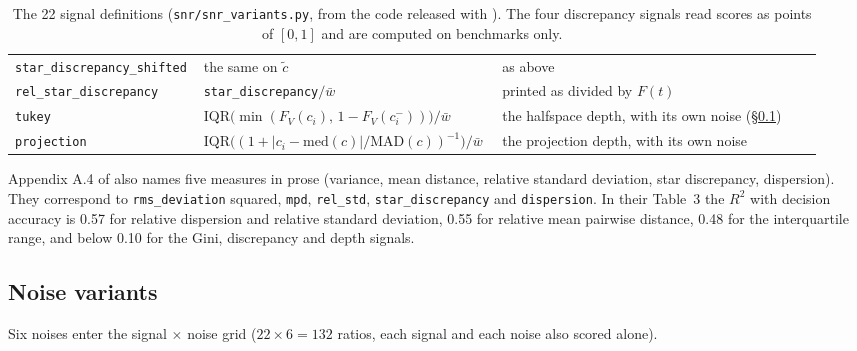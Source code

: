 \begin{table}[h]
\begin{tabular}{@{}p{0.19\linewidth}p{0.36\linewidth}p{0.39\linewidth}@{}}
\texttt{star\_discrepancy\_shifted} & the same on $\tilde{c}$ & as above \\
\texttt{rel\_star\_discrepancy} & \texttt{star\_discrepancy}$/\bar{w}$ & printed as divided by $F(t)$ \\
\texttt{tukey} & $\mathrm{IQR}\big(\min(F_V(c_i),\, 1 - F_V(c_i^-))\big)/\bar{w}$ & the halfspace depth, with its own noise (\S\ref{app:sur-noise}) \\
\texttt{projection} & $\mathrm{IQR}\big((1 + |c_i - \mathrm{med}(c)|/\mathrm{MAD}(c))^{-1}\big)/\bar{w}$ & the projection depth, with its own noise \\
\bottomrule
\end{tabular}
\caption{The 22 signal definitions (\texttt{snr/snr\_variants.py}, from the code released with \citet{heineman_signal_2025}). The four discrepancy signals read scores as points of $[0,1]$ and are computed on benchmarks only.}
\label{tab:sur-signals}
\end{table}

Appendix A.4 of \citet{heineman_signal_2025} also names five measures in prose (variance, mean distance, relative standard deviation, star discrepancy, dispersion). They correspond to \texttt{rms\_deviation} squared, \texttt{mpd}, \texttt{rel\_std}, \texttt{star\_discrepancy} and \texttt{dispersion}.
In their Table~3 the $R^2$ with decision accuracy is 0.57 for relative dispersion and relative standard deviation, 0.55 for relative mean pairwise distance, 0.48 for the interquartile range, and below 0.10 for the Gini, discrepancy and depth signals.

\subsection{Noise variants}
\label{app:sur-noise}

Six noises enter the signal $\times$ noise grid ($22 \times 6 = 132$ ratios, each signal and each noise also scored alone).


